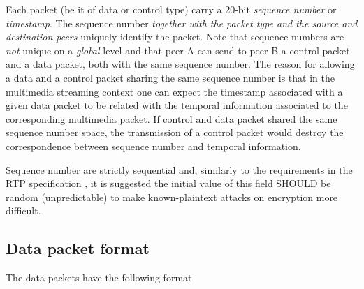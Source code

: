 \documentclass{rfc}
\begin{document}
Each packet (be it of data or control type) carry a 20-bit \emph{sequence
number} or \emph{timestamp}.  The sequence number \emph{together with
the packet type and the source and destination peers} uniquely
identify the packet.  Note that sequence numbers are \emph{not} unique
on a \emph{global} level and that peer A can send to peer B a control
packet and a data packet, both with the same sequence number.  The
reason for allowing a data and a control packet sharing the same
sequence number is that in the multimedia streaming context one can
expect the timestamp associated with a given data packet to be related
with the temporal information associated to the corresponding
multimedia packet.  If control and data packet shared the same
sequence number space, the transmission of a control packet would
destroy the correspondence between sequence number and temporal
information.   

Sequence number are strictly sequential and, similarly to the
requirements in the RTP specification \cite{rfc3550}, it is suggested
the initial value of this field SHOULD be random (unpredictable) to
make known-plaintext attacks on encryption more difficult.

\subsection{Data packet format}
\label{subsub:0.0.2;driver}

The data packets have the following format
\end{document}
